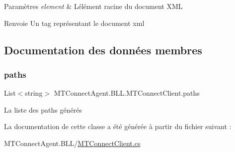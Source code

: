 \begin{DoxyParams}{Paramètres}
{\em element} & L\textquotesingle{}élément racine du document X\+ML\\
\hline
\end{DoxyParams}
\begin{DoxyReturn}{Renvoie}
Un tag représentant le document xml
\end{DoxyReturn}


\subsection{Documentation des données membres}
\mbox{\label{class_m_t_connect_agent_1_1_b_l_l_1_1_m_t_connect_client_ad1f188c1a4cd646e7630866643045d34}} 
\subsubsection{\texorpdfstring{paths}{paths}}
{\footnotesize\ttfamily List$<$string$>$ M\+T\+Connect\+Agent.\+B\+L\+L.\+M\+T\+Connect\+Client.\+paths\hspace{0.3cm}{\ttfamily [private]}}



La liste des paths générés 



La documentation de cette classe a été générée à partir du fichier suivant \+:\begin{DoxyCompactItemize}
\item 
M\+T\+Connect\+Agent.\+B\+L\+L/\mbox{\hyperlink{_m_t_connect_client_8cs}{M\+T\+Connect\+Client.\+cs}}\end{DoxyCompactItemize}
